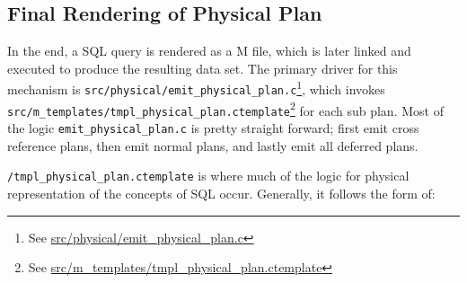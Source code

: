 \documentclass[]{article}
\def\code#1{\texttt{#1}}
\newcommand{\gitlab}[1]{\footnote{See \href{https://gitlab.com/YottaDB/DBMS/YDBOcto/blob/master/#1}{#1}}}
\begin{document}
\subsection{Final Rendering of Physical Plan}

In the end, a SQL query is rendered as a M file, which is later linked and executed to produce the resulting data set.
The primary driver for this mechanism is \code{src/physical/emit\_physical\_plan.c}\gitlab{src/physical/emit\_physical\_plan.c}, which invokes \code{src/m\_templates/tmpl\_physical\_plan.ctemplate}\gitlab{src/m\_templates/tmpl\_physical\_plan.ctemplate} for each sub plan.
Most of the logic \code{emit\_physical\_plan.c} is pretty straight forward; first emit cross reference plans, then emit normal plans, and lastly emit all deferred plans.

\code{/tmpl\_physical\_plan.ctemplate} is where much of the logic for physical representation of the concepts of SQL occur.
Generally, it follows the form of:
\end{document}
